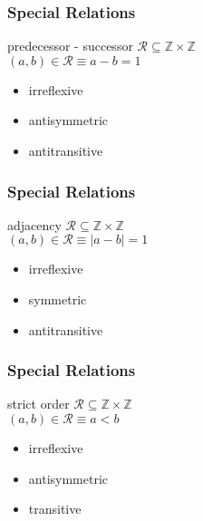 \documentclass[dvipsnames]{beamer}
\begin{document}
\begin{frame}
  \frametitle{Special Relations}

  \begin{block}{predecessor - successor}
    $\mathcal{R} \subseteq \mathbb{Z} \times \mathbb{Z}$\\
    $(a,b) \in \mathcal{R} \equiv a-b=1$

    \medskip
    \begin{itemize}
      \item irreflexive
      \item antisymmetric
      \item antitransitive
    \end{itemize}
  \end{block}
\end{frame}

\begin{frame}
  \frametitle{Special Relations}

  \begin{block}{adjacency}
    $\mathcal{R} \subseteq \mathbb{Z} \times \mathbb{Z}$\\
    $(a,b) \in \mathcal{R} \equiv |a-b|=1$

    \medskip
    \begin{itemize}
      \item irreflexive
      \item symmetric
      \item antitransitive
    \end{itemize}
  \end{block}
\end{frame}

\begin{frame}
  \frametitle{Special Relations}

  \begin{block}{strict order}
    $\mathcal{R} \subseteq \mathbb{Z} \times \mathbb{Z}$\\
    $(a,b) \in \mathcal{R} \equiv a<b$

    \medskip
    \begin{itemize}
      \item irreflexive
      \item antisymmetric
      \item transitive
    \end{itemize}
  \end{block}
\end{frame}
\end{document}
